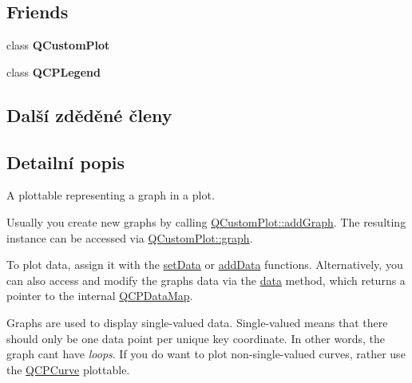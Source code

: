 \subsection*{Friends}
\begin{DoxyCompactItemize}
\item 
\hypertarget{classQCPGraph_a1cdf9df76adcfae45261690aa0ca2198}{}class {\bfseries Q\+Custom\+Plot}\label{classQCPGraph_a1cdf9df76adcfae45261690aa0ca2198}

\item 
\hypertarget{classQCPGraph_a8429035e7adfbd7f05805a6530ad5e3b}{}class {\bfseries Q\+C\+P\+Legend}\label{classQCPGraph_a8429035e7adfbd7f05805a6530ad5e3b}

\end{DoxyCompactItemize}
\subsection*{Další zděděné členy}


\subsection{Detailní popis}
A plottable representing a graph in a plot. 



Usually you create new graphs by calling \hyperlink{classQCustomPlot_a6fb2873d35a8a8089842d81a70a54167}{Q\+Custom\+Plot\+::add\+Graph}. The resulting instance can be accessed via \hyperlink{classQCustomPlot_a6d3ed93c2bf46ab7fa670d66be4cddaf}{Q\+Custom\+Plot\+::graph}.

To plot data, assign it with the \hyperlink{classQCPGraph_a1df2fd710545c8ba3b2c99a39a27bf8b}{set\+Data} or \hyperlink{classQCPGraph_aa5c6181d84db72ce4dbe9dc15a34ef4f}{add\+Data} functions. Alternatively, you can also access and modify the graph\textquotesingle{}s data via the \hyperlink{classQCPGraph_a2f58436df4f86a2792b776a21642b3d9}{data} method, which returns a pointer to the internal \hyperlink{qcustomplot_8h_a84a9c4a4c2216ccfdcb5f3067cda76e3}{Q\+C\+P\+Data\+Map}.

Graphs are used to display single-\/valued data. Single-\/valued means that there should only be one data point per unique key coordinate. In other words, the graph can\textquotesingle{}t have {\itshape loops}. If you do want to plot non-\/single-\/valued curves, rather use the \hyperlink{classQCPCurve}{Q\+C\+P\+Curve} plottable.

